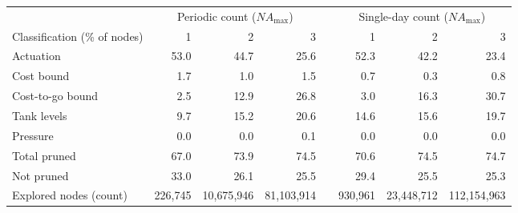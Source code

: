 \begin{tabular}{@{}l@{\quad}rrr@{}p{1em}@{}rrr@{}}
  \hline
   & \multicolumn{3}{c}{Periodic count ($NA_{\max}$)} &  & \multicolumn{3}{c}{Single-day count ($NA_{\max}$)} \\
  \cline{2-4} \cline{6-8}
  Classification (\% of nodes) & 1 & 2 & 3 &  & 1 & 2 & 3 \\
  \hline
  Actuation & 53.0 & 44.7 & 25.6 &  & 52.3 & 42.2 & 23.4 \\
  Cost bound & 1.7 & 1.0 & 1.5 &  & 0.7 & 0.3 & 0.8 \\
  Cost-to-go bound & 2.5 & 12.9 & 26.8 &  & 3.0 & 16.3 & 30.7 \\
  Tank levels & 9.7 & 15.2 & 20.6 &  & 14.6 & 15.6 & 19.7 \\
  Pressure & 0.0 & 0.0 & 0.1 &  & 0.0 & 0.0 & 0.0 \\
  Total pruned & 67.0 & 73.9 & 74.5 &  & 70.6 & 74.5 & 74.7 \\
  Not pruned & 33.0 & 26.1 & 25.5 &  & 29.4 & 25.5 & 25.3 \\
  \hline
  Explored nodes (count) & 226{,}745 & 10{,}675{,}946 & 81{,}103{,}914 &  & 930{,}961 & 23{,}448{,}712 & 112{,}154{,}963 \\
  \hline
\end{tabular}
